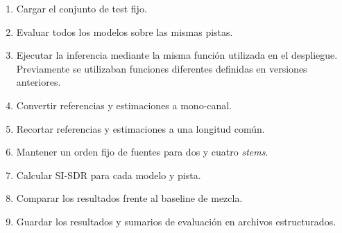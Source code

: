 \begin{enumerate}
    \item Cargar el conjunto de test fijo.
    \item Evaluar todos los modelos sobre las mismas pistas. 
    \item Ejecutar la inferencia mediante la misma función utilizada en el despliegue. Previamente se utilizaban funciones diferentes definidas en versiones anteriores. 
    \item Convertir referencias y estimaciones a mono-canal. 
    \item Recortar referencias y estimaciones a una longitud común. 
    \item Mantener un orden fijo de fuentes para dos y cuatro \textit{stems}. 
    \item Calcular SI-SDR para cada modelo y pista. 
    \item Comparar los resultados frente al baseline de mezcla. 
    \item Guardar los resultados y sumarios de evaluación en archivos estructurados. 
\end{enumerate}